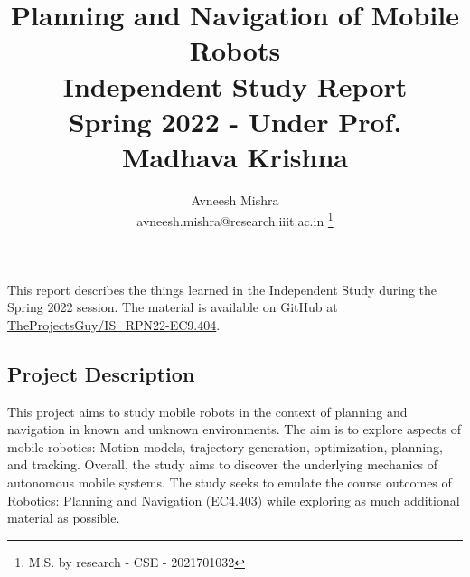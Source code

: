 


{
   \fancyhf{}
   \renewcommand{\headrulewidth}{0pt} %
}

\title{Planning and Navigation of Mobile Robots \\
    \Large Independent Study Report \\
    \small Spring 2022 - Under Prof. Madhava Krishna
}

\author{Avneesh Mishra \\
    avneesh.mishra@research.iiit.ac.in
    \thanks{M.S. by research - CSE - 2021701032}}


    \maketitle
    \thispagestyle{fancy_tr_rno}
    
    This report describes the things learned in the Independent Study during the Spring 2022 session. The material is available on GitHub at \href{https://github.com/TheProjectsGuy/IS_RPN22-EC9.404}{TheProjectsGuy/IS\_RPN22-EC9.404}.

    \subsection*{Project Description}
    This project aims to study mobile robots in the context of planning and navigation in known and unknown environments. The aim is to explore aspects of mobile robotics: Motion models, trajectory generation, optimization, planning, and tracking. Overall, the study aims to discover the underlying mechanics of autonomous mobile systems. The study seeks to emulate the course outcomes of Robotics: Planning and Navigation (EC4.403) while exploring as much additional material as possible.

    \tableofcontents

    \pagebreak
    
    \pagebreak
    
    \pagebreak
    
    \pagebreak
    


